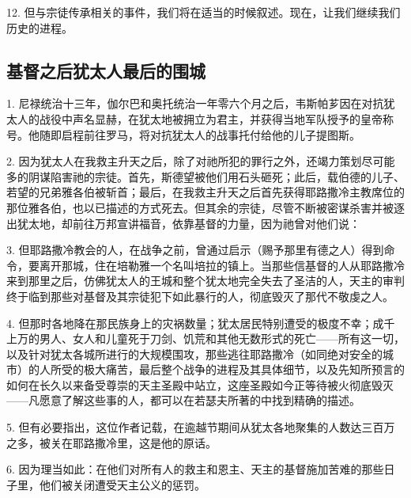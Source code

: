 12. 但与宗徒传承相关的事件，我们将在适当的时候叙述。现在，让我们继续我们历史的进程。\par


\subsection{基督之后犹太人最后的围城}

1. 尼禄统治十三年，伽尔巴和奥托统治一年零六个月之后，韦斯帕芗因在对抗犹太人的战役中声名显赫，在犹太地被拥立为君主，并获得当地军队授予的皇帝称号。他随即启程前往罗马，将对抗犹太人的战事托付给他的儿子提图斯。\par

2. 因为犹太人在我救主升天之后，除了对祂所犯的罪行之外，还竭力策划尽可能多的阴谋陷害祂的宗徒。首先，斯德望被他们用石头砸死；此后，载伯德的儿子、若望的兄弟雅各伯被斩首；最后，在我救主升天之后首先获得耶路撒冷主教席位的那位雅各伯，也以已描述的方式死去。但其余的宗徒，尽管不断被密谋杀害并被逐出犹太地，却前往万邦宣讲福音，依靠基督的力量，因为祂曾对他们说：\par

3. 但耶路撒冷教会的人，在战争之前，曾通过启示（赐予那里有德之人）得到命令，要离开那城，住在培勒雅一个名叫培拉的镇上。当那些信基督的人从耶路撒冷来到那里之后，仿佛犹太人的王城和整个犹太地完全失去了圣洁的人，天主的审判终于临到那些对基督及其宗徒犯下如此暴行的人，彻底毁灭了那代不敬虔之人。\par

4. 但那时各地降在那民族身上的灾祸数量；犹太居民特别遭受的极度不幸；成千上万的男人、女人和儿童死于刀剑、饥荒和其他无数形式的死亡——所有这一切，以及针对犹太各城所进行的大规模围攻，那些逃往耶路撒冷（如同绝对安全的城市）的人所受的极大痛苦，最后整个战争的进程及其具体细节，以及先知所预言的如何在长久以来备受尊崇的天主圣殿中站立，这座圣殿如今正等待被火彻底毁灭——凡愿意了解这些事的人，都可以在若瑟夫所著的中找到精确的描述。\par

5. 但有必要指出，这位作者记载，在逾越节期间从犹太各地聚集的人数达三百万之多，被关在耶路撒冷里，这是他的原话。\par

6. 因为理当如此：在他们对所有人的救主和恩主、天主的基督施加苦难的那些日子里，他们被关闭遭受天主公义的惩罚。\par

